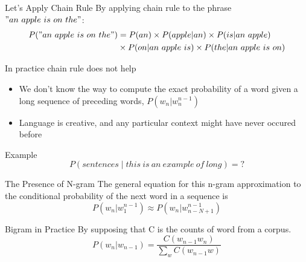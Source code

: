 \documentclass{beamer}
\begin{document}
\begin{frame}{Let's Apply Chain Rule}
By applying chain rule to the phrase $"an\ apple\ is\ on\ the"$:
    \begin{align*}
        P("an\ apple\ is\ on\ the") &= P(an)\times P(apple|an) \times P(is|an\ apple)\\
                                  &\times P(on|an\ apple\ is) \times P(the|an\ apple\ is\ on) 
    \end{align*}
\end{frame}

\begin{frame}{In practice chain rule does not help}
    \begin{itemize}
        \item We don't know the way to compute the exact probability of a word given a long sequence of preceding words, $P(w_n|w_n^{n-1})$
        \item Language is creative, and any particular context might have never occured before
    \end{itemize}
    \begin{block}{Example}
        $$P(sentences\mid this\ is\ an\ example\ of\ long) = \mathord{?}$$
    \end{block}
\end{frame}

\begin{frame}{The Presence of N-gram}
    The general equation for this n-gram approximation to the conditional probability of the next word in a sequence is
    $$P(w_n|w_1^{n-1}) \approx P(w_n|w_{n-N+1}^{n-1})$$


\end{frame}


\begin{frame}{Bigram in Practice}
By supposing that C is the counts of word from a corpus.
    $$P(w_n|w_{n-1}) = \frac{C(w_{n-1}w_n)}{\sum_{w}C(w_{n-1}w)}$$

\end{frame}
\end{document}
